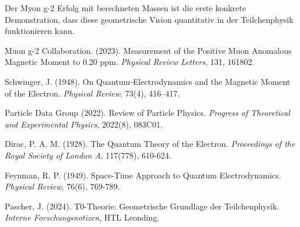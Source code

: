 \documentclass[12pt,a4paper]{article}
\numberwithin{equation}{section}
\begin{document}
	Der Myon g-2 Erfolg mit berechneten Massen ist die erste konkrete Demonstration, dass diese geometrische Vision quantitativ in der Teilchenphysik funktionieren kann.
	
	\begin{thebibliography}{99}
		
		Muon g-2 Collaboration. (2023). Measurement of the Positive Muon Anomalous Magnetic Moment to 0.20 ppm. \emph{Physical Review Letters}, 131, 161802.
		
		Schwinger, J. (1948). On Quantum-Electrodynamics and the Magnetic Moment of the Electron. \emph{Physical Review}, 73(4), 416--417.
		
		Particle Data Group (2022). Review of Particle Physics. \emph{Progress of Theoretical and Experimental Physics}, 2022(8), 083C01.
		
		Dirac, P. A. M. (1928). The Quantum Theory of the Electron. \emph{Proceedings of the Royal Society of London A}, 117(778), 610-624.
		
		Feynman, R. P. (1949). Space-Time Approach to Quantum Electrodynamics. \emph{Physical Review}, 76(6), 769-789.
		
		Pascher, J. (2024). T0-Theorie: Geometrische Grundlage der Teilchenphysik. \emph{Interne Forschungsnotizen}, HTL Leonding.
		
	\end{thebibliography}
	
\end{document}
